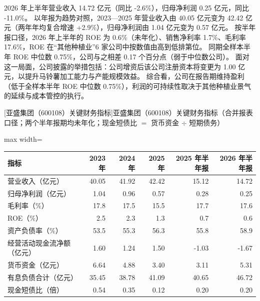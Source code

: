  2026 年上半年营业收入 14.72 亿元（同比 -2.6\%），归母净利润 0.25 亿元，同比 -11.0\%。 以年报为趋势对照，2023---2025 年营业收入由 40.05 亿元变为 42.42 亿元（两年年均复合增速 +2.9\%），归母净利润由 1.04 亿元变为 0.57 亿元。 按半年报口径，2026 年上半年的 ROE 为 0.6\%（未年化）、销售净利率 1.7\%、毛利率 17.6\%，ROE 在“其他种植业”6 家公司中按数值由高到低排第位。 同期全样本半年 ROE 中位数 0.75\%，公司与之相差 0.17 个百分点（弱于中位数公司）。 面对这一局面，公司披露的举措包括：公司增资后该公司注册资本将变更为 1.00 亿元，以提升马铃薯加工能力与产能规模效益。 综合看，公司在报告期维持盈利（低于全样本半年 ROE 中位数 0.75\%），利润的可持续性取决于其他种植业景气的延续与成本管控的执行。

\begin{center}\small\setlength{\tabcolsep}{3.4pt}
[亚盛集团（600108）关键财务指标]{亚盛集团（600108）关键财务指标（合并报表口径；两个半年报期均未年化；现金短债比 $=$ 货币资金 $\div$ 短期债务）}
\begin{adjustbox}{max width=\textwidth}
\begin{tabular}{@{}lrrrrr@{}}
\toprule
指标 & 2023 年 & 2024 年 & 2025 年 & 2025 年半年报 & 2026 年半年报 \\
\midrule
营业收入（亿元） & 40.05 & 41.92 & 42.42 & 15.12 & 14.72 \\
归母净利润（亿元） & 1.04 & 0.96 & 0.57 & 0.28 & 0.25 \\
毛利率（\%） & 17.8 & 17.5 & 15.5 & 17.7 & 17.6 \\
ROE（\%） & 2.5 & 2.3 & 1.3 & 0.7 & 0.6 \\
资产负债率（\%） & 53.5 & 55.3 & 56.3 & 55.8 & 58.9 \\
经营活动现金流净额（亿元） & 1.60 & 1.24 & 1.50 & -1.03 & -1.67 \\
货币资金（亿元） & 6.64 & 4.88 & 3.40 & 3.11 & 5.31 \\
有息负债合计（亿元） & 35.45 & 38.78 & 41.09 & 40.65 & 46.72 \\
现金短债比（倍） & 0.54 & 0.35 & 0.12 & 0.20 & 0.20 \\
\bottomrule
\end{tabular}
\end{adjustbox}
\end{center}

